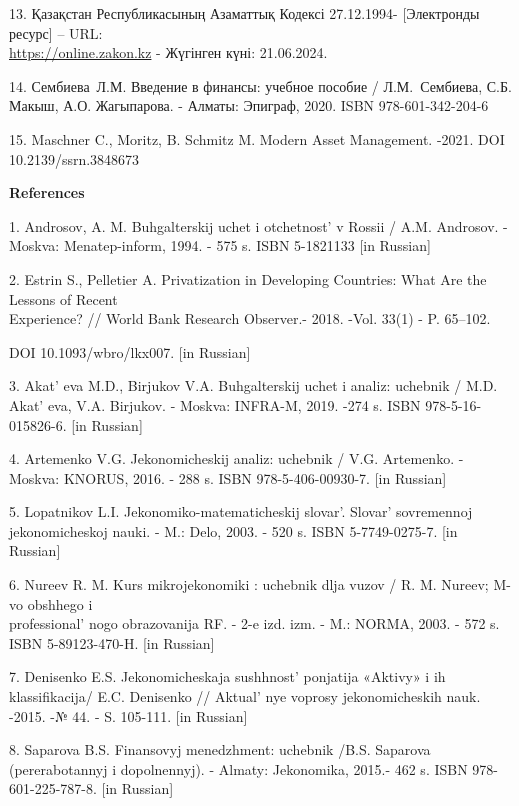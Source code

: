 \begin{references}
13. Қазақстан Республикасының Азаматтық Кодексі 27.12.1994- {[}Электронды
ресурс{]} -- URL:\\
\href{https://online.zakon.kz/Document/?doc\%20_id=51006061}{https://online.zakon.kz} - Жүгінген күні: 21.06.2024.

14. Сембиева~Л.М. Введение в финансы: учебное пособие / Л.М.~Сембиева,
С.Б. Макыш, А.О. Жагыпарова. - Алматы: Эпиграф, 2020. ISBN
978-601-342-204-6

15. Maschner C., Moritz, B. Schmitz M. Modern Asset Management. -2021. DOI
10.2139/ssrn.3848673
\end{references}

\begin{center}
{\bfseries References}
\end{center}

\begin{references}
1. Androsov, A. M. Buhgalterskij uchet i otchetnost'{} v
Rossii / A.M. Androsov. -Moskva: Menatep-inform, 1994. - 575 s. ISBN
5-1821133 {[}in Russian{]}

2. Estrin S., Pelletier A. Privatization in Developing Countries: What
Are the Lessons of Recent \\Experience? // World Bank Research Observer.-
2018. -Vol. 33(1) - P. 65--102.

DOI 10.1093/wbro/lkx007. {[}in Russian{]}

3. Akat' eva M.D., Birjukov V.A. Buhgalterskij uchet i
analiz: uchebnik / M.D. Akat' eva, V.A. Birjukov. -
Moskva: INFRA-M, 2019. -274 s. ISBN 978-5-16-015826-6. {[}in Russian{]}

4. Artemenko V.G. Jekonomicheskij analiz: uchebnik / V.G. Artemenko. -
Moskva: KNORUS, 2016. - 288 s. ISBN 978-5-406-00930-7. {[}in Russian{]}

5. Lopatnikov L.I. Jekonomiko-matematicheskij slovar'.
Slovar'{} sovremennoj jekonomicheskoj nauki. - M.: Delo,
2003. - 520 s. ISBN 5-7749-0275-7. {[}in Russian{]}

6. Nureev R. M. Kurs mikrojekonomiki : uchebnik dlja vuzov / R. M.
Nureev; M-vo obshhego i \\professional' nogo obrazovanija
RF. - 2-e izd. izm. - M.: NORMA, 2003. - 572 s. ISBN 5-89123-470-H.
{[}in Russian{]}

7. Denisenko E.S. Jekonomicheskaja sushhnost'{} ponjatija
«Aktivy» i ih klassifikacija/ E.C. Denisenko //
Aktual' nye voprosy jekonomicheskih nauk. -2015. -№ 44. -
S. 105-111. {[}in Russian{]}

8. Saparova B.S. Finansovyj menedzhment: uchebnik /B.S. Saparova
(pererabotannyj i dopolnennyj). - Almaty: Jekonomika, 2015.- 462 s. ISBN
978-601-225-787-8. {[}in Russian{]}


\end{references}
